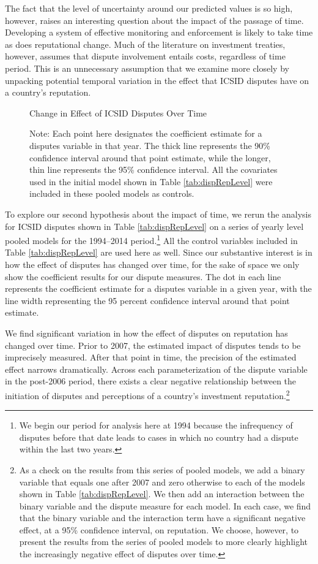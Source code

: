 \documentclass[12pt,onesided]{amsart}
\begin{document}

The fact that the level of uncertainty around our predicted values is so high, however, raises an interesting question about the impact of the passage of time. Developing a system of effective monitoring and enforcement is likely to take time as does reputational change. Much of the literature on investment treaties, however, assumes that dispute involvement entails costs, regardless of time period. This is an unnecessary assumption that we examine more closely by unpacking potential temporal variation in the effect that ICSID disputes have on a country's reputation.

\begin{figure}[ht]
	\centering
	\caption{Change in Effect of ICSID Disputes Over Time}
	\label{fig:dispEffectYear}
	\resizebox{1\textwidth}{!}{}
	\caption*{Note: Each point here designates the coefficient estimate for a disputes variable in that year. The thick line represents the 90\% confidence interval around that point estimate, while the longer, thin line represents the 95\% confidence interval. All the covariates used in the initial model shown in Table \ref{tab:dispRepLevel} were included in these pooled models as controls.}
\end{figure}
\FloatBarrier

To explore our second hypothesis about the impact of time, we rerun the analysis for ICSID disputes shown in Table \ref{tab:dispRepLevel} on a series of yearly level pooled models for the 1994--2014 period.\footnote{We begin our period for analysis here at 1994 because the infrequency of disputes before that date leads to cases in which no country had a dispute within the last two years.} All the control variables included in Table \ref{tab:dispRepLevel} are used here as well. Since our substantive interest is in how the effect of disputes has changed over time, for the sake of space we only show the coefficient results for our dispute measures. The dot in each line represents the coefficient estimate for a disputes variable in a given year, with the line width representing the 95 percent confidence interval around that point estimate. 

We find significant variation in how the effect of disputes on reputation has changed over time. Prior to 2007, the estimated impact of disputes tends to be imprecisely measured. After that point in time, the precision of the estimated effect narrows dramatically. Across each parameterization of the dispute variable in the post-2006 period, there exists a clear negative relationship between the initiation of disputes and perceptions of a country's investment reputation.\footnote{As a check on the results from this series of pooled models, we add a binary variable that equals one after 2007 and zero otherwise to each of the models shown in Table \ref{tab:dispRepLevel}. We then add an interaction between the binary variable and the dispute measure for each model. In each case, we find that the binary variable and the interaction term have a significant negative effect, at a 95\% confidence interval, on reputation. We choose, however, to present the results from the series of pooled models to more clearly highlight the increasingly negative effect of disputes over time.} 
\end{document}
